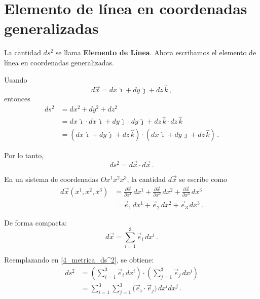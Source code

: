 \documentclass[../apunte_mecanica_clasica.tex]{subfiles}%
\begin{document}
\section{Elemento de línea en coordenadas generalizadas}

La cantidad $ds^2$ se llama \textbf{Elemento de Línea}. 
Ahora escribamos el elemento de línea en coordenadas generalizadas. 

Usando
\begin{equation*}
    d\vec{x} = dx \, \hat{\imath} + dy \, \hat{\jmath} + dz \, \hat{k} \,,
\end{equation*}
entonces
\begin{align*}
    ds^2 &= dx^2 + dy^2 + dz^2 \\[2pt]
          &= dx \, \hat{\imath} \cdot dx \, \hat{\imath} 
           + dy \, \hat{\jmath} \cdot dy \, \hat{\jmath} 
           + dz \, \hat{k} \cdot dz \, \hat{k} \\[2pt]
          &= (dx \, \hat{\imath} + dy \, \hat{\jmath} + dz \, \hat{k})
             \cdot (dx \, \hat{\imath} + dy \, \hat{\jmath} + dz \, \hat{k}) \,.
\end{align*}

Por lo tanto,
\begin{equation}\label{4_metrica_ds^2}
    ds^2 = d\vec{x} \cdot d\vec{x} \,.
\end{equation}

En un sistema de coordenadas $Ox^1x^2x^3$, la cantidad $d\vec{x}$ se escribe como
\begin{align*}
    d\vec{x}(x^1, x^2, x^3) &= 
    \frac{\partial \vec{x}}{\partial x^1} \, dx^1 
    + \frac{\partial \vec{x}}{\partial x^2} \, dx^2 
    + \frac{\partial \vec{x}}{\partial x^3} \, dx^3 \\[4pt]
    &= \vec{e}_1 \, dx^1 + \vec{e}_2 \, dx^2 + \vec{e}_3 \, dx^3 \,.
\end{align*}

De forma compacta:
\begin{equation*}
    d\vec{x} = \sum_{i=1}^3 \vec{e}_i \, dx^i \,.
\end{equation*}

Reemplazando en \eqref{4_metrica_ds^2}, se obtiene:
\begin{align}
    ds^2 &= \left( \sum_{i=1}^3 \vec{e}_i \, dx^i \right) 
            \cdot 
            \left( \sum_{j=1}^3 \vec{e}_j \, dx^j \right) \nonumber \\[2pt]
          &= \sum_{i=1}^3 \sum_{j=1}^3 
             \big( \vec{e}_i \cdot \vec{e}_j \big) \, dx^i dx^j \,.
             \label{4_metrica_elemento_linea_general}
\end{align}
\end{document}
